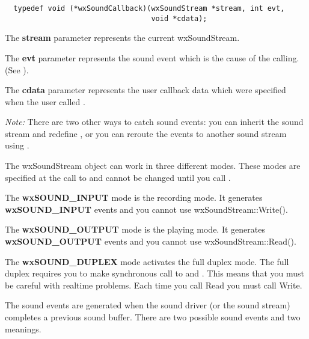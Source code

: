\begin{verbatim}
  typedef void (*wxSoundCallback)(wxSoundStream *stream, int evt,
                                  void *cdata);
\end{verbatim}

The {\bf stream} parameter represents the current wxSoundStream.

The {\bf evt} parameter represents the sound event which is the cause of the calling. (See ).

The {\bf cdata} parameter represents the user callback data which were specified
when the user called .

{\it Note:} There are two other ways to catch sound events: you can inherit the
sound stream and redefine , or you can reroute the events to another sound stream using .



The wxSoundStream object can work in three different modes. These modes are specified
at the call to  
and cannot be changed until you call 
.

The {\bf wxSOUND\_INPUT} mode is the recording mode. It generates {\bf wxSOUND\_INPUT} 
events and you cannot use wxSoundStream::Write().

The {\bf wxSOUND\_OUTPUT} mode is the playing mode. It generates {\bf wxSOUND\_OUTPUT} 
events and you cannot use wxSoundStream::Read().

The {\bf wxSOUND\_DUPLEX} mode activates the full duplex mode. The full duplex requires
you to make synchronous call to  and 
. This means that you must be
careful with realtime problems. Each time you call Read you must call Write.



The sound events are generated when the sound driver (or the sound stream) completes
a previous sound buffer. There are two possible sound events and two meanings.


